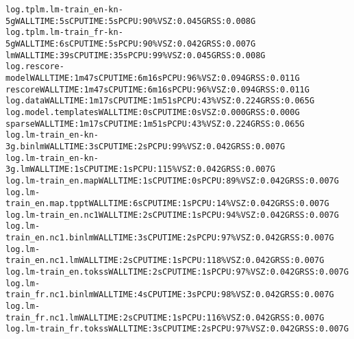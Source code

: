 \documentclass[11pt,letterpaper]{article}
\begin{document}
\begin{tiny}
\begin{alltt}
         log.tplm.lm-train_en-kn-5g                       WALL TIME: 5s       CPU TIME: 5s        PCPU: 90\%    VSZ: 0.045G    RSS: 0.008G
         log.tplm.lm-train_fr-kn-5g                       WALL TIME: 6s       CPU TIME: 5s        PCPU: 90\%    VSZ: 0.042G    RSS: 0.007G
      lm                                                  WALL TIME: 39s      CPU TIME: 35s       PCPU: 99\%    VSZ: 0.045G    RSS: 0.008G
         log.rescore-model                                WALL TIME: 1m47s    CPU TIME: 6m16s     PCPU: 96\%    VSZ: 0.094G    RSS: 0.011G
      rescore                                             WALL TIME: 1m47s    CPU TIME: 6m16s     PCPU: 96\%    VSZ: 0.094G    RSS: 0.011G
         log.data                                         WALL TIME: 1m17s    CPU TIME: 1m51s     PCPU: 43\%    VSZ: 0.224G    RSS: 0.065G
         log.model.templates                              WALL TIME: 0s       CPU TIME: 0s                     VSZ: 0.000G    RSS: 0.000G
      sparse                                              WALL TIME: 1m17s    CPU TIME: 1m51s     PCPU: 43\%    VSZ: 0.224G    RSS: 0.065G
         log.lm-train_en-kn-3g.binlm                      WALL TIME: 3s       CPU TIME: 2s        PCPU: 99\%    VSZ: 0.042G    RSS: 0.007G
         log.lm-train_en-kn-3g.lm                         WALL TIME: 1s       CPU TIME: 1s        PCPU: 115\%   VSZ: 0.042G    RSS: 0.007G
         log.lm-train_en.map                              WALL TIME: 1s       CPU TIME: 0s        PCPU: 89\%    VSZ: 0.042G    RSS: 0.007G
         log.lm-train_en.map.tppt                         WALL TIME: 6s       CPU TIME: 1s        PCPU: 14\%    VSZ: 0.042G    RSS: 0.007G
         log.lm-train_en.nc1                              WALL TIME: 2s       CPU TIME: 1s        PCPU: 94\%    VSZ: 0.042G    RSS: 0.007G
         log.lm-train_en.nc1.binlm                        WALL TIME: 3s       CPU TIME: 2s        PCPU: 97\%    VSZ: 0.042G    RSS: 0.007G
         log.lm-train_en.nc1.lm                           WALL TIME: 2s       CPU TIME: 1s        PCPU: 118\%   VSZ: 0.042G    RSS: 0.007G
         log.lm-train_en.tokss                            WALL TIME: 2s       CPU TIME: 1s        PCPU: 97\%    VSZ: 0.042G    RSS: 0.007G
         log.lm-train_fr.nc1.binlm                        WALL TIME: 4s       CPU TIME: 3s        PCPU: 98\%    VSZ: 0.042G    RSS: 0.007G
         log.lm-train_fr.nc1.lm                           WALL TIME: 2s       CPU TIME: 1s        PCPU: 116\%   VSZ: 0.042G    RSS: 0.007G
         log.lm-train_fr.tokss                            WALL TIME: 3s       CPU TIME: 2s        PCPU: 97\%    VSZ: 0.042G    RSS: 0.007G

\end{alltt}
\end{tiny}
\end{document}
